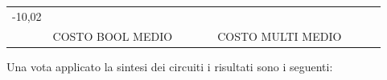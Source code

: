 \documentclass[
]{book}
\begin{document}
\begin{longtable}[]{@{}lllllllll@{}}
\begin{minipage}[t]{0.07\columnwidth}
-10,02\strut
\end{minipage}\tabularnewline
\begin{minipage}[t]{0.07\columnwidth}\raggedright
\strut
\end{minipage} & \begin{minipage}[t]{0.11\columnwidth}\raggedright
COSTO BOOL MEDIO\strut
\end{minipage} & \begin{minipage}[t]{0.08\columnwidth}\raggedright
\strut
\end{minipage} & \begin{minipage}[t]{0.07\columnwidth}\raggedright
\strut
\end{minipage} & \begin{minipage}[t]{0.09\columnwidth}\raggedright
\strut
\end{minipage} & \begin{minipage}[t]{0.12\columnwidth}\raggedright
COSTO MULTI MEDIO\strut
\end{minipage} & \begin{minipage}[t]{0.08\columnwidth}\raggedright
\strut
\end{minipage} & \begin{minipage}[t]{0.07\columnwidth}\raggedright
\strut
\end{minipage} & \begin{minipage}[t]{0.07\columnwidth}\raggedright
\strut
\end{minipage}\tabularnewline
\bottomrule
\end{longtable}

\newpage

Una vota applicato la sintesi dei circuiti i risultati sono i seguenti:
\end{document}
